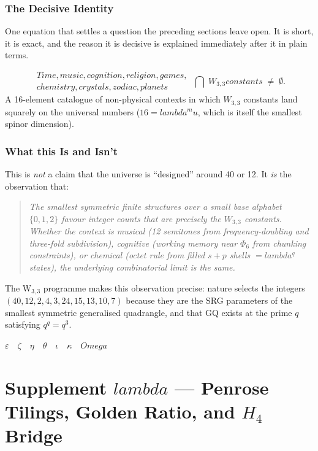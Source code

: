 \documentclass[12pt,a4paper]{article}
\def\text#1{#1}%
\def\lambda{lambda}%
\def\mu{mu}%
\def\Phi#1{Phi#1}%
\def\Omega{Omega}%
\theoremstyle{definition}
\begin{document}
\section*{The Decisive Identity}

\begin{plainbox}
One equation that settles a question the preceding sections leave open. It is short,
it is exact, and the reason it is decisive is explained immediately after it in plain
terms.
\end{plainbox}


\[
\boxed{\;
\substack{\text{Time, music, cognition, religion, games,}\\
\text{chemistry, crystals, zodiac, planets} } \;\bigcap\;
W_{3,3}\text{ constants}\;\ne\;\emptyset.\;}
\]
A 16-element catalogue of non-physical contexts in which $W_{3,3}$
constants land squarely on the universal numbers ($16 = \lambda^\mu$,
which is itself the smallest spinor dimension).

\section*{What this Is and Isn't}

This is \emph{not} a claim that the universe is ``designed'' around 40
or 12. It \emph{is} the observation that:
\begin{quote}\em
The smallest symmetric finite structures over a small base alphabet
$\{0, 1, 2\}$ favour integer counts that are precisely the
$W_{3,3}$ constants. Whether the context is musical (12 semitones
from frequency-doubling and three-fold subdivision), cognitive
(working memory near $\Phi_6$ from chunking constraints), or
chemical (octet rule from filled $s+p$ shells $= \lambda^q$ states),
the underlying combinatorial limit is the same.
\end{quote}

The W$_{3,3}$ programme makes this observation precise: nature
selects the integers
$(40, 12, 2, 4, 3, 24, 15, 13, 10, 7)$
because they are the SRG parameters of the smallest symmetric
generalised quadrangle, and that GQ exists at the prime $q$
satisfying $q^q = q^3$.

\hfill$\varepsilon\quad\zeta\quad\eta\quad\theta\quad\iota\quad\kappa\quad\Omega$

\clearpage
\part*{\texorpdfstring{Supplement $\lambda$ --- Penrose Tilings, Golden Ratio, and $H_4$ Bridge}{Supplement lambda --- Penrose Tilings, Golden Ratio, and H4 Bridge}}
\end{document}

